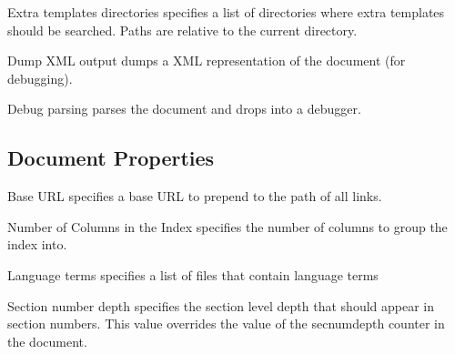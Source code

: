 \begin{configuration}{Extra templates directories}
specifies a list of directories where extra templates
should be searched. Paths are relative to the current directory.
\end{configuration}

\begin{configuration}{Dump XML output}
dumps a XML representation of the document (for debugging).
\end{configuration}

\begin{configuration}{Debug parsing}
parses the document and drops into a debugger.
\end{configuration}

\subsection{Document Properties\label{sec:config-document}}

\begin{configuration}{Base URL}
specifies a base URL to prepend to the path of all links.
\end{configuration}

\begin{configuration}{Number of Columns in the Index}
specifies the number of columns to group the index into.
\end{configuration}

\begin{configuration}{Language terms}
specifies a list of files that contain language terms
\end{configuration}

\begin{configuration}{Section number depth}
specifies the section level depth that should appear in section numbers.
This value overrides the value of the secnumdepth counter in the document.
\end{configuration}

